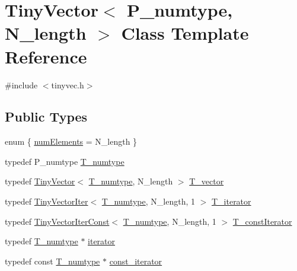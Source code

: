 \hypertarget{classTinyVector}{}\section{Tiny\+Vector$<$ P\+\_\+numtype, N\+\_\+length $>$ Class Template Reference}
\label{classTinyVector}


{\ttfamily \#include $<$tinyvec.\+h$>$}

\subsection*{Public Types}
\begin{DoxyCompactItemize}
\item 
enum \{ \hyperlink{classTinyVector_a274167b76b956bd9e6dee2885a259bb5a1f76817120f91910580eea984b03f1c9}{num\+Elements} = N\+\_\+length
 \}
\item 
typedef P\+\_\+numtype \hyperlink{classTinyVector_ab8e7df758dd5a369e92b3cb54a48bdbe}{T\+\_\+numtype}
\item 
typedef \hyperlink{classTinyVector}{Tiny\+Vector}$<$ \hyperlink{classTinyVector_ab8e7df758dd5a369e92b3cb54a48bdbe}{T\+\_\+numtype}, N\+\_\+length $>$ \hyperlink{classTinyVector_aea08e4463006acf6842a93c026b27094}{T\+\_\+vector}
\item 
typedef \hyperlink{classTinyVectorIter}{Tiny\+Vector\+Iter}$<$ \hyperlink{classTinyVector_ab8e7df758dd5a369e92b3cb54a48bdbe}{T\+\_\+numtype}, N\+\_\+length, 1 $>$ \hyperlink{classTinyVector_a6044134b6f2401fe4e2d73bd7dfa25c7}{T\+\_\+iterator}
\item 
typedef \hyperlink{classTinyVectorIterConst}{Tiny\+Vector\+Iter\+Const}$<$ \hyperlink{classTinyVector_ab8e7df758dd5a369e92b3cb54a48bdbe}{T\+\_\+numtype}, N\+\_\+length, 1 $>$ \hyperlink{classTinyVector_af420f8f49beb7efac60ac22a5d1f2e84}{T\+\_\+const\+Iterator}
\item 
typedef \hyperlink{classTinyVector_ab8e7df758dd5a369e92b3cb54a48bdbe}{T\+\_\+numtype} $\ast$ \hyperlink{classTinyVector_a7e1e065c0b894add536ab278dfe28202}{iterator}
\item 
typedef const \hyperlink{classTinyVector_ab8e7df758dd5a369e92b3cb54a48bdbe}{T\+\_\+numtype} $\ast$ \hyperlink{classTinyVector_a58fc9319708794276cdad6399cf03eed}{const\+\_\+iterator}
\end{DoxyCompactItemize}
